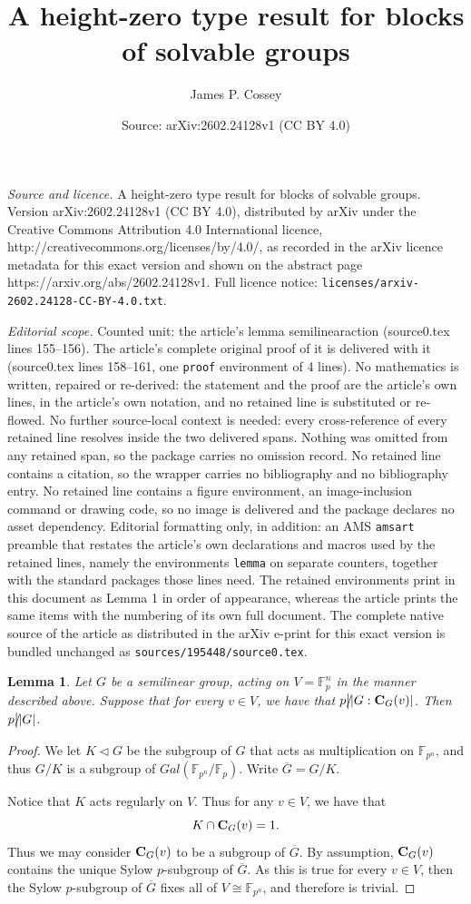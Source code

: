 \documentclass[10pt,a4paper]{amsart}
\title{A height-zero type result for blocks of solvable groups}
\author{James P. Cossey}
\date{Source: arXiv:2602.24128v1 (CC BY 4.0)}
\newtheorem{lemma}{Lemma}
\newcommand \F {\mathbb F}
\newcommand \cent {{\bf{C}}}
\newcommand \dvd {\hbox {\big|}}
\newcommand \ndvd {\hbox {/}\kern-5pt\dvd}
\newcommand \nrml {\lhd}
\begin{document}
\maketitle

\noindent\emph{Source and licence.} A height-zero type result for blocks of solvable groups. Version arXiv:2602.24128v1 (CC BY 4.0), distributed by arXiv under the Creative Commons Attribution 4.0 International licence, http://creativecommons.org/licenses/by/4.0/, as recorded in the arXiv licence metadata for this exact version and shown on the abstract page https://arxiv.org/abs/2602.24128v1. Full licence notice: \texttt{licenses/arxiv-2602.24128-CC-BY-4.0.txt}.\par\smallskip

\noindent\textit{Editorial scope.} Counted unit: the article's lemma semilinearaction (source0.tex lines 155--156). The article's complete original proof of it is delivered with it (source0.tex lines 158--161, one \texttt{proof} environment of 4 lines). No mathematics is written, repaired or re-derived: the statement and the proof are the article's own lines, in the article's own notation, and no retained line is substituted or re-flowed.  No further source-local context is needed: every cross-reference of every retained line resolves inside the two delivered spans.  Nothing was omitted from any retained span, so the package carries no omission record.  No retained line contains a citation, so the wrapper carries no bibliography and no bibliography entry.  No retained line contains a figure environment, an image-inclusion command or drawing code, so no image is delivered and the package declares no asset dependency.  Editorial formatting only, in addition: an AMS \texttt{amsart} preamble that restates the article's own declarations and macros used by the retained lines, namely the environments \texttt{lemma} on separate counters, together with the standard packages those lines need.  The retained environments print in this document as Lemma 1 in order of appearance, whereas the article prints the same items with the numbering of its own full document.  The complete native source of the article as distributed in the arXiv e-print for this exact version is bundled unchanged as \texttt{sources/195448/source0.tex}.
\begin{lemma}\label{semilinearaction}  Let $G$ be a semilinear group, acting on $V = \F_p^n$ in the manner described above.  Suppose that for every $v \in V$, we have that $p \ndvd |G : \cent_G(v)|$.  Then $p \ndvd |G|$.
\end{lemma}

\begin{proof}  We let $K \nrml G$ be the subgroup of $G$ that acts as multiplication on $\F_{p^n}$, and thus $G/K$ is a subgroup of $Gal(\F_{p^n}/\F_p)$.  Write ${\overline{G}} = G/K$.

Notice that $K$ acts regularly on $V$.  Thus for any $v \in V$, we have that $$K \cap \cent_G(v) = 1.$$  Thus we may consider $\cent_G(v)$ to be a subgroup of ${\overline{G}}$.  By assumption, $\cent_G(v)$ contains the unique Sylow $p$-subgroup of ${\overline{G}}$.  As this is true for every $v \in V$, then the Sylow $p$-subgroup of $\overline{G}$ fixes all of $V \cong \F_{p^n}$, and therefore is trivial.
\end{proof}
\end{document}
